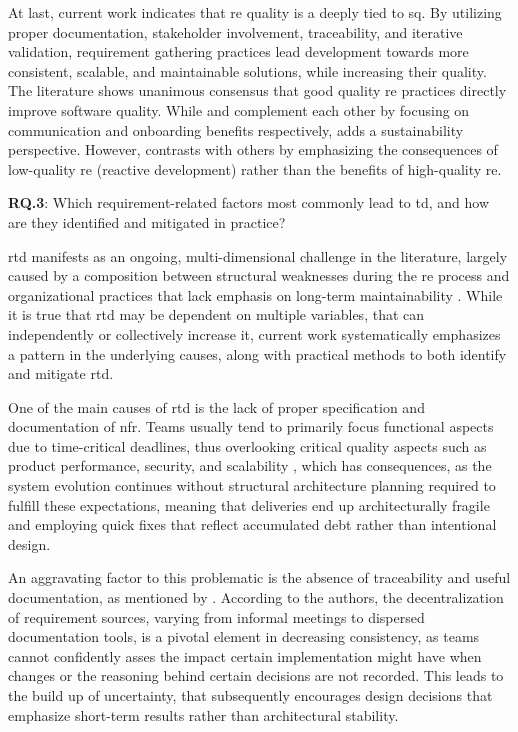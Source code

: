 \documentclass[12pt,reqno, twoside]{amsbook}
\theoremstyle{plain}
\numberwithin{equation}{chapter}
\numberwithin{section}{chapter}
\begin{document}
At last, current work indicates that \gls{re} quality is a deeply tied to \gls{sq}. By utilizing proper documentation, stakeholder involvement, traceability, and iterative validation, requirement gathering practices lead development towards more consistent, scalable, and maintainable solutions, while increasing their quality. The literature shows unanimous consensus that good quality \gls{re} practices directly improve software quality. While \textcite{Behutiye2022} and \textcite{Melo2022} complement each other by focusing on communication and onboarding benefits respectively, \textcite{Venters2023} adds a sustainability perspective. However, \textcite{Vogelsang2020} contrasts with others by emphasizing the consequences of low-quality \gls{re} (reactive development) rather than the benefits of high-quality \gls{re}.
\hspace*{\linewidth}\par
\noindent\textbf{RQ.3}: Which requirement-related factors most commonly lead to \gls{td}, and how are they identified and mitigated in practice?

\gls{rtd} manifests as an ongoing, multi-dimensional challenge in the literature, largely caused by a composition between structural weaknesses during the \gls{re} process and organizational practices that lack emphasis on long-term maintainability \parencite{Melo2022}. While it is true that \gls{rtd} may be dependent on multiple variables, that can independently or collectively increase it, current work systematically emphasizes a pattern in the underlying causes, along with practical methods to both identify and mitigate \gls{rtd}.

One of the main causes of \gls{rtd} is the lack of proper specification and documentation of \gls{nfr}. Teams usually tend to primarily focus functional aspects due to time-critical deadlines, thus overlooking critical quality aspects such as product performance, security, and scalability \parencite{Farias2020, Behutiye2022}, which has consequences, as the system evolution continues without structural architecture planning required to fulfill these expectations, meaning that deliveries end up architecturally fragile and employing quick fixes that reflect accumulated debt rather than intentional design.

An aggravating factor to this problematic is the absence of traceability and useful documentation, as mentioned by \textcite{Rios2020, Wattanakriengkrai2019}. According to the authors, the decentralization of requirement sources, varying from informal meetings to dispersed documentation tools, is a pivotal element in decreasing consistency, as teams cannot confidently asses the impact certain implementation might have when changes or the reasoning behind certain decisions are not recorded. This leads to the build up of uncertainty, that subsequently encourages design decisions that emphasize short-term results rather than architectural stability.
\end{document}
